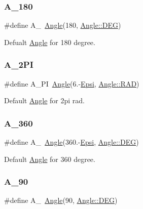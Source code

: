 \subsubsection{\texorpdfstring{A\_180}{A\_180}}
{\footnotesize\ttfamily \#define A\+\_~\mbox{\hyperlink{class_angle}{Angle}}(180, \mbox{\hyperlink{class_angle_a4f7b9849ce8780bcba95ca3ee45cff77a65e2aa4bc05730c9c2e8fdaf73612282}{Angle\+::\+D\+EG}})}



Defualt \mbox{\hyperlink{class_angle}{Angle}} for 180 degree. 

\mbox{\label{maths_8hh_ad7760000c41920a1ae5cf0f6bf0e4c77}} 
\subsubsection{\texorpdfstring{A\_2PI}{A\_2PI}}
{\footnotesize\ttfamily \#define A\+\_\+PI~\mbox{\hyperlink{class_angle}{Angle}}(6.-\/\mbox{\hyperlink{maths_8hh_a78802b279ab85021d7f6bffe51621703}{Epsi}}, \mbox{\hyperlink{class_angle_a4f7b9849ce8780bcba95ca3ee45cff77a93ab6b68075fd7a6fe724fbde5b13c1f}{Angle\+::\+R\+AD}})}



Default \mbox{\hyperlink{class_angle}{Angle}} for 2pi rad. 

\mbox{\label{maths_8hh_ae46eba4b5423f51b80f3446e128c6476}} 
\subsubsection{\texorpdfstring{A\_360}{A\_360}}
{\footnotesize\ttfamily \#define A\+\_~\mbox{\hyperlink{class_angle}{Angle}}(360.-\/\mbox{\hyperlink{maths_8hh_a78802b279ab85021d7f6bffe51621703}{Epsi}}, \mbox{\hyperlink{class_angle_a4f7b9849ce8780bcba95ca3ee45cff77a65e2aa4bc05730c9c2e8fdaf73612282}{Angle\+::\+D\+EG}})}



Default \mbox{\hyperlink{class_angle}{Angle}} for 360 degree. 

\mbox{\label{maths_8hh_ae49ec00d228075202319f793f89e39b5}} 
\subsubsection{\texorpdfstring{A\_90}{A\_90}}
{\footnotesize\ttfamily \#define A\+\_~\mbox{\hyperlink{class_angle}{Angle}}(90, \mbox{\hyperlink{class_angle_a4f7b9849ce8780bcba95ca3ee45cff77a65e2aa4bc05730c9c2e8fdaf73612282}{Angle\+::\+D\+EG}})}



